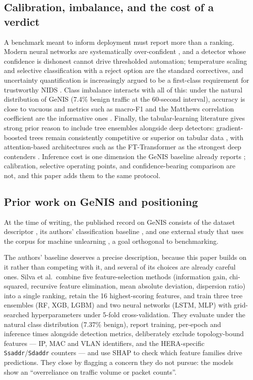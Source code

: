 \documentclass[review,12pt]{elsarticle}
\begin{document}
\subsection{Calibration, imbalance, and the cost of a verdict}
A benchmark meant to inform deployment must report more than a ranking.
Modern neural networks are systematically over-confident
\cite{guo2017calibration}, and a detector whose confidence is dishonest
cannot drive thresholded automation; temperature scaling
\cite{guo2017calibration} and selective classification with a reject option
\cite{geifman2017selective,hendrickx2024reject} are the standard correctives,
and uncertainty quantification is increasingly argued to be a first-class
requirement for trustworthy NIDS \cite{talpini2024uncertainty}. Class
imbalance interacts with all of this: under the natural distribution of
GeNIS (7.4\% benign traffic at the 60-second interval), accuracy is close to
vacuous and metrics such as macro-F1 and the Matthews correlation
coefficient are the informative ones \cite{chicco2020mcc}. Finally, the
tabular-learning literature gives strong prior reason to include tree
ensembles alongside deep detectors: gradient-boosted trees remain
consistently competitive or superior on tabular data
\cite{grinsztajn2022trees,shwartzziv2022tabular}, with attention-based
architectures such as the FT-Transformer as the strongest deep contenders
\cite{gorishniy2021ftt}. Inference cost is one dimension the GeNIS baseline
already reports \cite{silva2025binary}; calibration, selective operating
points, and confidence-bearing comparison are not, and this paper adds them
to the same protocol.

\subsection{Prior work on GeNIS and positioning}
At the time of writing, the published record on GeNIS consists of the
dataset descriptor \cite{silva2025genis}, its authors' classification
baseline \cite{silva2025binary}, and one external study that uses the corpus
for machine unlearning \cite{magalhaes2026unlearning}, a goal orthogonal to
benchmarking.

The authors' baseline deserves a precise description, because this paper
builds on it rather than competing with it, and several of its choices are
already careful ones. Silva et al.\ combine five feature-selection methods
(information gain, chi-squared, recursive feature elimination, mean absolute
deviation, dispersion ratio) into a single ranking, retain the 16
highest-scoring features, and train three tree ensembles (RF, XGB, LGBM) and
two neural networks (LSTM, MLP) with grid-searched hyperparameters under
5-fold cross-validation. They evaluate under the natural class distribution
(7.37\% benign), report training, per-epoch and inference times alongside
detection metrics, deliberately exclude topology-bound features --- IP, MAC
and VLAN identifiers, and the HERA-specific \texttt{Ssaddr}/\texttt{Sdaddr}
counters --- and use SHAP to check which feature families drive predictions.
They close by flagging a concern they do not pursue: the models show an
``overreliance on traffic volume or packet counts''.
\end{document}
